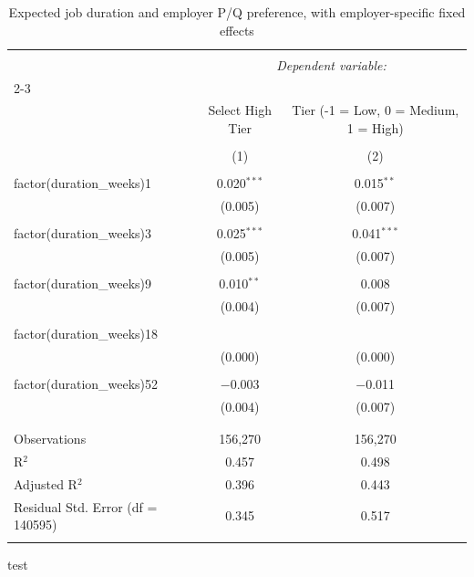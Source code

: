 
\begin{table}[!htbp] \centering 
  \caption{Expected job duration and employer P/Q preference, with employer-specific fixed effects} 
  \label{tab:job_duration} 
\begin{tabular}{@{\extracolsep{5pt}}lcc} 
\\[-1.8ex]\hline 
\hline \\[-1.8ex] 
 & \multicolumn{2}{c}{\textit{Dependent variable:}} \\ 
\cline{2-3} 
\\[-1.8ex] & Select High Tier & Tier (-1 = Low, 0 = Medium, 1 = High) \\ 
\\[-1.8ex] & (1) & (2)\\ 
\hline \\[-1.8ex] 
 factor(duration\_weeks)1 & 0.020$^{***}$ & 0.015$^{**}$ \\ 
  & (0.005) & (0.007) \\ 
  & & \\ 
 factor(duration\_weeks)3 & 0.025$^{***}$ & 0.041$^{***}$ \\ 
  & (0.005) & (0.007) \\ 
  & & \\ 
 factor(duration\_weeks)9 & 0.010$^{**}$ & 0.008 \\ 
  & (0.004) & (0.007) \\ 
  & & \\ 
 factor(duration\_weeks)18 &  &  \\ 
  & (0.000) & (0.000) \\ 
  & & \\ 
 factor(duration\_weeks)52 & $-$0.003 & $-$0.011 \\ 
  & (0.004) & (0.007) \\ 
  & & \\ 
\hline \\[-1.8ex] 
Observations & 156,270 & 156,270 \\ 
R$^{2}$ & 0.457 & 0.498 \\ 
Adjusted R$^{2}$ & 0.396 & 0.443 \\ 
Residual Std. Error (df = 140595) & 0.345 & 0.517 \\ 
\hline 
\hline \\[-1.8ex] 
\end{tabular}
test
\end{table}
